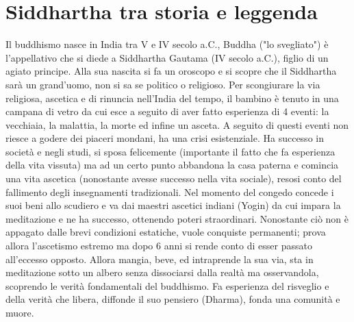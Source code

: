 \documentclass[10pt,a4paper]{report}
\begin{document}
\section{Siddhartha tra storia e leggenda}
Il buddhismo nasce in India tra V e IV secolo a.C., Buddha ("lo svegliato") è l'appellativo che si diede a Siddhartha Gautama (IV secolo a.C.), figlio di un agiato principe. Alla sua nascita si fa un oroscopo e si scopre che il Siddhartha sarà un grand'uomo, non si sa se politico o religioso. Per scongiurare la via religiosa, ascetica e di rinuncia nell'India del tempo, il bambino è tenuto in una campana di vetro da cui esce a seguito di aver fatto esperienza di 4 eventi: la vecchiaia, la malattia, la morte ed infine un asceta. A seguito di questi eventi non riesce a godere dei piaceri mondani, ha una crisi esistenziale. Ha successo in società e negli studi, si sposa felicemente (importante il fatto che fa esperienza della vita vissuta) ma ad un certo punto abbandona la casa paterna e comincia una vita ascetica (nonostante avesse successo nella vita sociale), resosi conto del fallimento degli insegnamenti tradizionali. Nel momento del congedo concede i suoi beni allo scudiero e va dai maestri ascetici indiani (Yogin) da cui impara la meditazione e ne ha successo, ottenendo poteri straordinari. Nonostante ciò non è appagato dalle brevi condizioni estatiche, vuole conquiste permanenti; prova allora l'ascetismo estremo ma dopo 6 anni si rende conto di esser passato all'eccesso opposto. Allora mangia, beve, ed intraprende la sua via, sta in meditazione sotto un albero senza dissociarsi dalla realtà ma osservandola, scoprendo le verità fondamentali del buddhismo. Fa esperienza del risveglio e della verità che libera, diffonde il suo pensiero (Dharma), fonda una comunità e muore.
 
\end{document}
